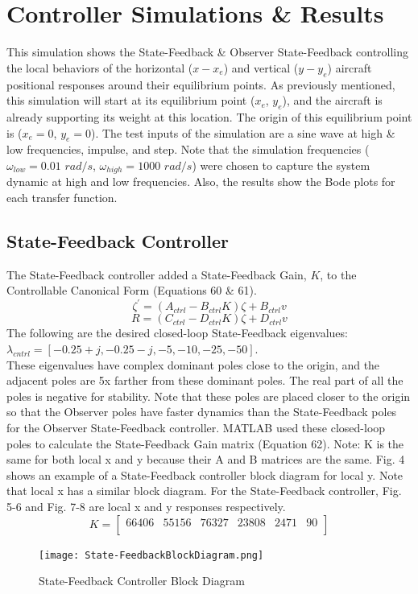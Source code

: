 \documentclass[conference]{IEEEtran}
\begin{document}
\section{Controller Simulations \& Results}
This simulation shows the State-Feedback \& Observer State-Feedback controlling the local behaviors of the horizontal ($x - x_e$) and vertical ($y - y_e$) aircraft positional responses around their equilibrium points. As previously mentioned, this simulation will start at its equilibrium point ($x_e$, $y_e$), and the aircraft is already supporting its weight at this location. The origin of this equilibrium point is ($x_e = 0$, $y_e = 0$). The test inputs of the simulation are a sine wave at high \& low frequencies, impulse, and step. Note that the simulation frequencies ($\omega_{low} = 0.01$ $rad/s$, $\omega_{high} = 1000$ $rad/s$) were chosen to capture the system dynamic at high and low frequencies. Also, the results show the Bode plots for each transfer function. \\

\subsection{State-Feedback Controller}
The State-Feedback controller added a State-Feedback Gain, $K$, to the Controllable Canonical Form (Equations 60 \& 61).\\
\[
\zeta^\prime = (A_{ctrl} - B_{ctrl}K)\zeta + B_{ctrl}v
\tag{60}
\] 
\[
R = (C_{ctrl}- D_{ctrl}K)\zeta + D_{ctrl}v
\tag{61}
\] 
\indent The following are the desired closed-loop State-Feedback eigenvalues:\\ $\lambda_{cntrl} = [-0.25 + j, -0.25 - j, -5, -10, -25, -50]$.\\ These eigenvalues have complex dominant poles close to the origin, and the adjacent poles are 5x farther from these dominant poles. The real part of all the poles is negative for stability. Note that these poles are placed closer to the origin so that the Observer poles have faster dynamics than the State-Feedback poles for the Observer State-Feedback controller. MATLAB used these closed-loop poles to calculate the State-Feedback Gain matrix (Equation 62). Note: K is the same for both local x and y because their A and B matrices are the same. Fig. 4 shows an example of a State-Feedback controller block diagram for local y. Note that local x has a similar block diagram. For the State-Feedback controller, Fig. 5-6 and Fig. 7-8 are local x and y responses respectively. 
\[
K = 
\begin{bmatrix}
66406& 55156&76327& 23808& 2471& 90\\
\end{bmatrix}
\tag{62}
\]
\begin{figure}[htbp]
\centering
\centerline{\texttt{[image: State-FeedbackBlockDiagram.png]}}
\caption{State-Feedback Controller Block Diagram}
\label{figure}
\end{figure}
\end{document}
